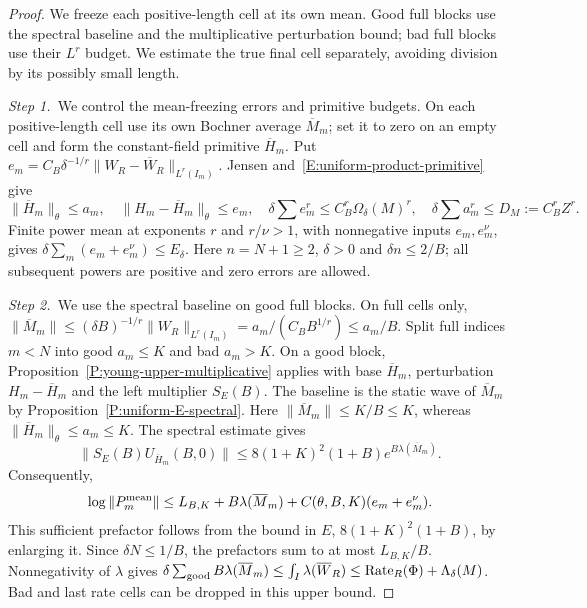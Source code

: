 \begin{proof}
  We freeze each positive-length cell at its own mean. Good full blocks use
  the spectral baseline and the multiplicative perturbation bound; bad full
  blocks use their $L^r$ budget. We estimate the true final cell separately,
  avoiding division by its possibly small length.


  \medskip
  \noindent\textit{Step 1.~}We control the mean-freezing errors and primitive
  budgets.
  On each positive-length cell use its own Bochner average $\overline{M}_m$; set
  it to zero on an empty cell and form the constant-field primitive
  $\overline{H}_m$. Put $e_m = C_B\delta^{-1/r}
  \|W_R-\overline{W}_R\|_{L^r(I_m)}$. Jensen
  and~\eqref{E:uniform-product-primitive} give
  \[
    \|\overline{H}_m\|_\theta\le a_m,\quad
    \|H_m-\overline{H}_m\|_\theta\le e_m,\quad
    \delta\sum e_m^r\le C_B^r\Omega_\delta(M)^r,\quad
    \delta\sum a_m^r\le D_M:=C_B^rZ^r .
  \]
  Finite power mean at exponents $r$ and $r/\nu > 1$, with nonnegative inputs
  $e_m,e_m^\nu$, gives $\delta\sum_m(e_m+e_m^\nu) \le E_\delta$. Here $n = N+1
  \ge 2$, $\delta > 0$ and $\delta n \le 2/B$; all subsequent powers are
  positive and zero errors are allowed.


  \medskip
  \noindent\textit{Step 2.~}We use the spectral baseline on good full blocks.
  On full cells only, $\|\overline{M}_m\| \le (\delta
  B)^{-1/r}\|W_R\|_{L^r(I_m)} = a_m/(C_BB^{1/r}) \le a_m/B$. Split full indices
  $m < N$ into good $a_m \le K$ and bad $a_m > K$. On a good block,
  Proposition~\ref{P:young-upper-multiplicative} applies with base
  $\overline{H}_m$, perturbation $H_m-\overline{H}_m$ and the left multiplier
  $S_E(B)$. The baseline is the static wave of $\overline{M}_m$ by
  Proposition~\ref{P:uniform-E-spectral}. Here $\|\overline{M}_m\| \le K/B \le
  K$, whereas $\|\overline{H}_m\|_\theta \le a_m \le K$. The spectral estimate
  gives
  \[
    \|S_E(B)U_{\overline{H}_m}(B,0)\|
    \le8(1+K)^2(1+B)e^{B\lambda(\overline{M}_m)}.
  \]
  Consequently,
  \[
    \log\|P_m^{\rm mean}\|
    \le L_{B,K}+B\lambda(\overline{M}_m)
    +C(\theta,B,K)(e_m+e_m^\nu).
  \]
  This sufficient prefactor follows from the bound in $E$, $8(1+K)^2(1+B)$, by
  enlarging it. Since $\delta N \le 1/B$, the prefactors sum to at most
  $L_{B,K}/B$. Nonnegativity of $\lambda$ gives $\delta\sum_{\rm
  good}B\lambda(\overline{M}_m) \le \int_I\lambda(\overline{W}_R) \le
  \operatorname{Rate}_R(\Phi)+\Lambda_\delta(M)$. Bad and last rate cells can be
  dropped in this upper bound.



\end{proof}
